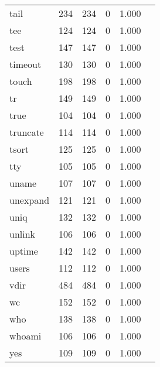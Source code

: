 \begin{longtable}{lp{2.20cm}p{2.20cm}p{2.20cm}p{2.20cm}p{2.20cm}}
tail      &                     234 &              234 &                 0 &                        1.000 \\
tee       &                     124 &              124 &                 0 &                        1.000 \\
test      &                     147 &              147 &                 0 &                        1.000 \\
timeout   &                     130 &              130 &                 0 &                        1.000 \\
touch     &                     198 &              198 &                 0 &                        1.000 \\
tr        &                     149 &              149 &                 0 &                        1.000 \\
true      &                     104 &              104 &                 0 &                        1.000 \\
truncate  &                     114 &              114 &                 0 &                        1.000 \\
tsort     &                     125 &              125 &                 0 &                        1.000 \\
tty       &                     105 &              105 &                 0 &                        1.000 \\
uname     &                     107 &              107 &                 0 &                        1.000 \\
unexpand  &                     121 &              121 &                 0 &                        1.000 \\
uniq      &                     132 &              132 &                 0 &                        1.000 \\
unlink    &                     106 &              106 &                 0 &                        1.000 \\
uptime    &                     142 &              142 &                 0 &                        1.000 \\
users     &                     112 &              112 &                 0 &                        1.000 \\
vdir      &                     484 &              484 &                 0 &                        1.000 \\
wc        &                     152 &              152 &                 0 &                        1.000 \\
who       &                     138 &              138 &                 0 &                        1.000 \\
whoami    &                     106 &              106 &                 0 &                        1.000 \\
yes       &                     109 &              109 &                 0 &                        1.000 \\
\end{longtable}
